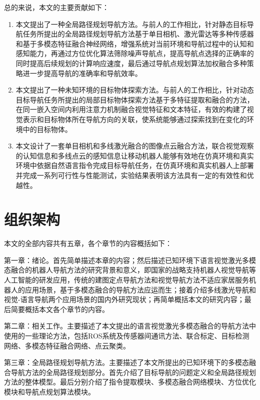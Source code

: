	总的来说，本文的主要贡献如下：
	\begin{enumerate}[topsep = 0 pt, itemsep= 0 pt, parsep=0pt, partopsep=0pt, leftmargin=44pt, itemindent=0pt, labelsep=6pt, label=(\arabic*)]
		\item 	本文提出了一种全局路径规划导航方法。与前人的工作相比，针对静态目标导航任务所提出的全局路径规划导航方法基于单目相机、激光雷达等多种传感器和基于多模态特征融合神经网络，增强系统对当前环境和导航过程中的认知和感知能力，再通过方位优化算法筛除噪声导航点，提高导航点选择的正确率的同时提高后续规划的计算响应速度，最后通过导航点规划算法加权融合多种策略进一步提高导航的准确率和导航效率。
		\item	本文提出了一种未知环境的目标物体探索方法。与前人的工作相比，针对动态目标导航任务所提出的局部目标物体探索方法基于多特征提取和融合的方法，在同一嵌入空间内利用注意力机制融合视觉特征和文本特征，有效的构建了视觉表示和目标物体所在导航方向的关联，使系统能够通过探索找到在变化的环境中的目标物体。
		\item	本文设计了一套单目相机和多线激光融合的图像点云融合方法，联合视觉观察的认知信息和多线点云的感知信息让移动机器人能够有效地在仿真环境和真实环境中依据自然语言指令完成目标导航任务，在仿真环境和真实机器人上部署并完成一系列可行性与性能测试，实验结果表明该方法具有一定的有效性和优越性。
	\end{enumerate}

\section{组织架构}
	本文的全部内容共有五章，各个章节的内容概括如下：

	第一章：绪论。首先简单描述本章的内容；然后描述已知环境下语言视觉激光多模态融合的机器人导航方法的研究背景和意义，即国家的战略支持机器人视觉导航等人工智能的研发应用，传统的建图定点导航方法和视觉导航方法不适应家居服务机器人的应用场景，基于多模态融合的导航方法应运而生；接着介绍多线激光导航和视觉-语言导航两个应用场景的国内外研究现状；再简单概括本文的研究内容；最后简要概括本文各个章节的内容。

	第二章：相关工作。主要描述了本文提出的语言视觉激光多模态融合的导航方法中使用的一些理论方法，包括ROS系统及传感器间通讯方法、联合标定、目标检测网络、多模态特征融合网络、点云聚类。

	第三章：全局路径规划导航方法。主要描述了本文所提出的已知环境下的多模态融合导航方法的全局路径规划部分。首先介绍了目标导航的问题定义和全局路径规划方法的整体模型。最后分别介绍了指令提取模块、多模态融合网络模块、方位优化模块和导航点规划算法模块。


